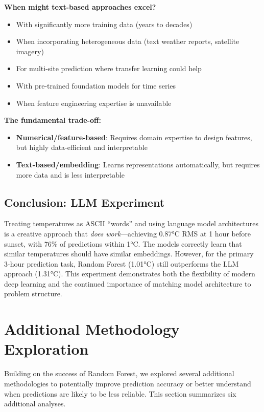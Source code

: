 \documentclass[11pt,letterpaper]{article}
\begin{document}
\textbf{When might text-based approaches excel?}
\begin{itemize}[noitemsep]
    \item With significantly more training data (years to decades)
    \item When incorporating heterogeneous data (text weather reports, satellite imagery)
    \item For multi-site prediction where transfer learning could help
    \item With pre-trained foundation models for time series
    \item When feature engineering expertise is unavailable
\end{itemize}

\textbf{The fundamental trade-off:}
\begin{itemize}[noitemsep]
    \item \textbf{Numerical/feature-based}: Requires domain expertise to design features, but highly data-efficient and interpretable
    \item \textbf{Text-based/embedding}: Learns representations automatically, but requires more data and is less interpretable
\end{itemize}

\subsection{Conclusion: LLM Experiment}

Treating temperatures as ASCII ``words'' and using language model architectures is a creative approach that \textit{does work}---achieving 0.87°C RMS at 1 hour before sunset, with 76\% of predictions within 1°C. The models correctly learn that similar temperatures should have similar embeddings. However, for the primary 3-hour prediction task, Random Forest (1.01°C) still outperforms the LLM approach (1.31°C). This experiment demonstrates both the flexibility of modern deep learning and the continued importance of matching model architecture to problem structure.

\section{Additional Methodology Exploration}

Building on the success of Random Forest, we explored several additional methodologies to potentially improve prediction accuracy or better understand when predictions are likely to be less reliable. This section summarizes six additional analyses.
\end{document}
